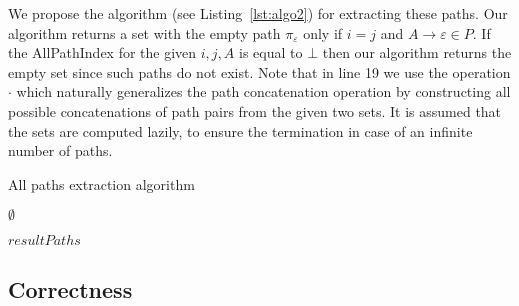 We propose the algorithm (see Listing~\ref{lst:algo2}) for extracting these paths. Our algorithm returns a set with the empty path $\pi_{\varepsilon}$ only if $i = j$ and $A \to \varepsilon \in P$. If the AllPathIndex for the given $i,j,A$ is equal to $\bot$ then our algorithm returns the empty set since such paths do not exist. Note that in line 19 we use
the operation $\cdot$ which naturally generalizes the path concatenation operation
by constructing all possible concatenations of path pairs from the given two
sets. It is assumed that the sets are computed lazily, to ensure the termination in case of an infinite number of paths.

\begin{algorithm}
	\small
	\begin{algorithmic}[1]
		\caption{All paths extraction algorithm}
		\label{lst:algo2}		
		
		\State \Return $\emptyset$
		\EndIf
		
		
		  
		\EndIf
		\EndFor
		\EndIf
		\Else {}
		\EndIf
		\EndFor
		\EndIf
		\EndFor
		\State \Return $resultPaths$
		\EndFunction
	\end{algorithmic}
\end{algorithm}

\subsection{Correctness}

